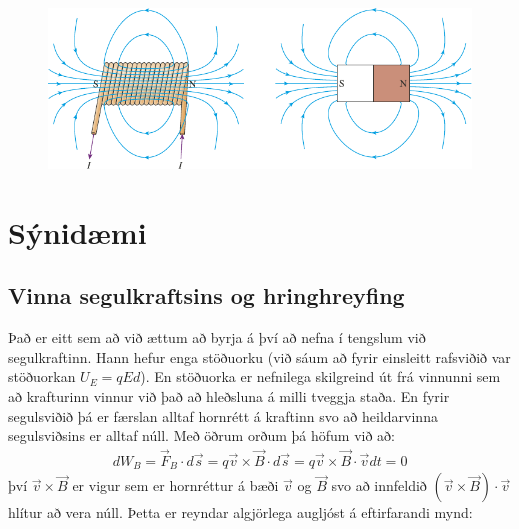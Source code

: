 \begin{figure}[H]
    \centering
    \includegraphics[scale = 0.8]{figures/segull2.pdf}
\end{figure}

\newpage

\section*{Sýnidæmi}

\subsection*{Vinna segulkraftsins og hringhreyfing}

Það er eitt sem að við ættum að byrja á því að nefna í tengslum við segulkraftinn. Hann hefur enga stöðuorku (við sáum að fyrir einsleitt rafsviðið var stöðuorkan $U_E = qEd$). En stöðuorka er nefnilega skilgreind út frá vinnunni sem að krafturinn vinnur við það að hleðsluna á milli tveggja staða. En fyrir segulsviðið þá er færslan alltaf hornrétt á kraftinn svo að heildarvinna segulsviðsins er alltaf núll. Með öðrum orðum þá höfum við að:
\begin{align*}
    dW_{B} = \vec{F}_B \cdot d\vec{s} = q \vec{v} \times \vec{B} \cdot  d\vec{s}  = q \vec{v} \times \vec{B} \cdot \vec{v}dt = 0
\end{align*}
því $\vec{v} \times \vec{B}$ er vigur sem er hornréttur á bæði $\vec{v}$ og $\vec{B}$ svo að innfeldið $(\vec{v} \times \vec{B}) \cdot \vec{v}$ hlítur að vera núll. Þetta er reyndar algjörlega augljóst á eftirfarandi mynd:

